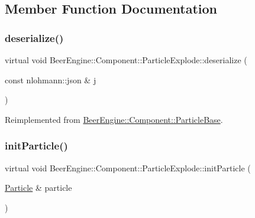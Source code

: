 \subsection{Member Function Documentation}
\mbox{\label{class_beer_engine_1_1_component_1_1_particle_explode_ad79e74129dd1cd7f20e0575a9ffdffc3}} 
\subsubsection{\texorpdfstring{deserialize()}{deserialize()}}
{\footnotesize\ttfamily virtual void Beer\+Engine\+::\+Component\+::\+Particle\+Explode\+::deserialize (\begin{DoxyParamCaption}\item[{const nlohmann\+::json \&}]{j }\end{DoxyParamCaption})\hspace{0.3cm}{\ttfamily [virtual]}}



Reimplemented from \mbox{\hyperlink{class_beer_engine_1_1_component_1_1_particle_base_a227b7fe0edab6df4b6c15f4b22bed7ae}{Beer\+Engine\+::\+Component\+::\+Particle\+Base}}.

\mbox{\label{class_beer_engine_1_1_component_1_1_particle_explode_abe727afab3c6a77d2b163e2c37a0f37b}} 
\subsubsection{\texorpdfstring{init\+Particle()}{initParticle()}}
{\footnotesize\ttfamily virtual void Beer\+Engine\+::\+Component\+::\+Particle\+Explode\+::init\+Particle (\begin{DoxyParamCaption}\item[{\mbox{\hyperlink{struct_beer_engine_1_1_component_1_1_particle}{Particle}} \&}]{particle }\end{DoxyParamCaption})\hspace{0.3cm}{\ttfamily [virtual]}}



